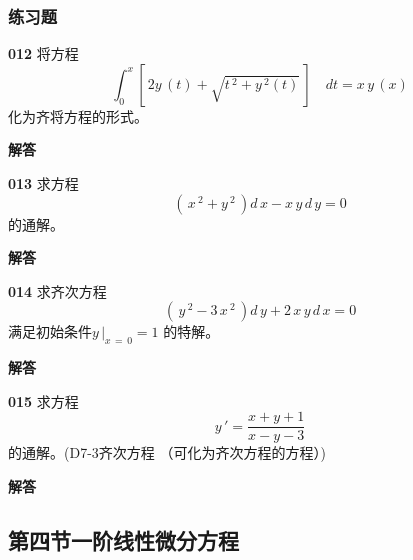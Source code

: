\documentclass[a4paper,10pt]{article} %
\begin{document}
\subsubsection{练习题}


\par\noindent \textbf{012} \quad 将方程
$$\int_0^x\left[\,2y\,(t)+\sqrt{t\,^2+y\,^2(t)}\,\right] \quad dt=x\,y\,(x)$$
化为齐将方程的形式。
\par\noindent \textbf{ 解答}





\textheight


\par\noindent \textbf{013} \quad 求方程
$$\left(\,x\,^2+y\,^2\,\right)d\,x-x\,y\,d\,y=0$$
的通解。
\par\noindent \textbf{ 解答}





\textheight


\par\noindent \textbf{014} \quad 求齐次方程
$$\left(\,y\,^2-3\,x\,^2\,\right)d\,y+2\,x\,y\,d\,x=0$$
满足初始条件$y\,|_{x\,=\,0}=1$
的特解。
\par\noindent \textbf{ 解答}





\textheight


\par\noindent \textbf{015} \quad 求方程
$$y\,' = \frac{x+y+1}{x-y-3}$$
的通解。(D7-3齐次方程 （可化为齐次方程的方程）)
\par\noindent \textbf{ 解答}





\textheight

\newpage
\subsection{第四节\quad 一阶线性微分方程}
\end{document}
